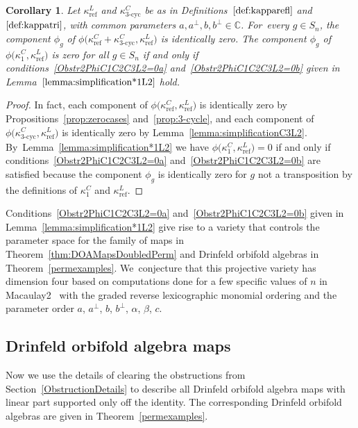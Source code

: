 \documentclass[pdftex]{sigma}
\numberwithin{equation}{section}
\newtheorem{Corollary}[Theorem]{Corollary}
\DeclareMathOperator{\refl}{ref}
\DeclareMathOperator{\tri}{3-cyc}
\begin{document}
\begin{Corollary}\label{cor:phiC3L2=0}
 Let $\kappa^L_{\refl}$ and $\kappa^C_{\tri}$ be as in Definitions~$\ref{def:kapparefl}$
 and~$\ref{def:kappatri}$, with common parameters $a,a^\perp,b,b^\perp \in\mathbb{C}$. For~every $g\in S_n$, the component $\phi_g$ of $\phi\big(\kappa^C_{\refl}+\kappa^C_{\tri},\kappa^L_{\refl}\big)$
 is identically zero. The component $\phi_g$ of $\phi\big(\kappa^C_1,\kappa^L_{\refl}\big)$
 is zero for all $g \in S_n$ if and only if conditions~\eqref{Obstr2PhiC1C2C3L2=0a}
 and~\eqref{Obstr2PhiC1C2C3L2=0b} given in Lemma~$\ref{lemma:simplification*1L2}$ hold.
\end{Corollary}

\begin{proof}
In fact, each component of $\phi\big(\kappa^C_{\refl},\kappa^L_{\refl}\big)$
is identically zero by Propositions~\ref{prop:zerocases} and~\ref{prop:3-cycle},
and each component of $\phi\big(\kappa^C_{\tri},\kappa^L_{\refl}\big)$ is identically zero
by Lemma~\ref{lemma:simplificationC3L2}. By~Lemma~\ref{lemma:simplification*1L2}
we have $\phi\big(\kappa^C_1,\kappa^L_{\refl}\big)=0$ if and only if
conditions~\eqref{Obstr2PhiC1C2C3L2=0a} and~\eqref{Obstr2PhiC1C2C3L2=0b}
are satisfied because the component $\phi_g$ is identically zero for $g$ not a
transposition by the definitions of $\kappa^C_1$ and $\kappa^L_{\refl}$.
\end{proof}

Conditions~\eqref{Obstr2PhiC1C2C3L2=0a} and~\eqref{Obstr2PhiC1C2C3L2=0b}
given in Lemma~\ref{lemma:simplification*1L2}
give rise to a variety that controls the para\-me\-ter space for the
family of maps in Theorem~\ref{thm:DOAMapsDoubledPerm}
and Drinfeld orbifold algebras in Theorem~\ref{permexamples}. We~conjecture that this projective variety has dimension four based on computations done
for a few specific values of $n$ in Macaulay2~\cite{M2} with the graded reverse
lexicographic monomial ordering and the
parameter order $a$, $a^\perp$, $b$, $b^\perp$, $\alpha$, $\beta$, $c$.


\subsection{Drinfeld orbifold algebra maps}
Now we use the details of clearing the obstructions from
Section~\ref{ObstructionDetails} to describe all Drinfeld orbi\-fold
algebra maps with linear part supported only off the identity.
The corresponding Drinfeld orbifold algebras are given in Theorem~\ref{permexamples}.
\end{document}
